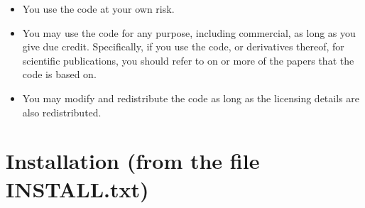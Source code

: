 \documentclass{article}
\begin{document}
\begin{itemize}
\item You use the code at your own risk.
\item You may use the code for any purpose, including commercial, as
long as you give due credit. Specifically, if you use the code, or
derivatives thereof, for scientific publications, you should refer
to on or more of the papers
\citet{Borlin2013:Bundle,Borlin2013:Experiments,Borlin2014:Camera,Borlin2016:External,Borlin2018:Modular,Borlin2019:Implementing,Borlin2019:Flexible,Borlin2020:Efficient}
that the code is based on.
\item You may modify and redistribute the code as long as the
licensing details are also redistributed.
\end{itemize}

\newpage
\section[Installation]{Installation (from the file INSTALL.txt)}
\label{sec:install}
\end{document}
